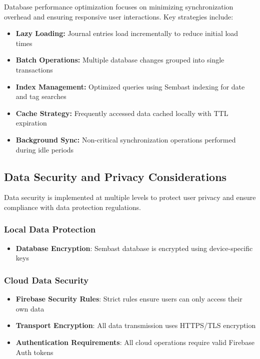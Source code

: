 Database performance optimization focuses on minimizing synchronization overhead and ensuring responsive user interactions. Key strategies include:

\begin{itemize}
\item \textbf{Lazy Loading:} Journal entries load incrementally to reduce initial load times
\item \textbf{Batch Operations:} Multiple database changes grouped into single transactions
\item \textbf{Index Management:} Optimized queries using Sembast indexing for date and tag searches
\item \textbf{Cache Strategy:} Frequently accessed data cached locally with TTL expiration
\item \textbf{Background Sync:} Non-critical synchronization operations performed during idle periods
\end{itemize}

\subsection{Data Security and Privacy Considerations}\label{subsec:data-security}

Data security is implemented at multiple levels to protect user privacy and ensure compliance with data protection regulations.

\subsubsection{Local Data Protection}

\begin{itemize}
    \item \textbf{Database Encryption}: Sembast database is encrypted using device-specific keys
\end{itemize}

\subsubsection{Cloud Data Security}

\begin{itemize}
    \item \textbf{Firebase Security Rules}: Strict rules ensure users can only access their own data
    \item \textbf{Transport Encryption}: All data transmission uses HTTPS/TLS encryption
    \item \textbf{Authentication Requirements}: All cloud operations require valid Firebase Auth tokens
\end{itemize}

